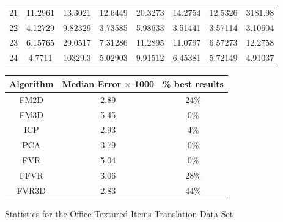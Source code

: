 \begin{figure}
\begin{tabular}{cccccccc}
21 & 11.2961 & 13.3021 & 12.6449 & 20.3273 & 14.2754 & 12.5326 & 3181.98\\
22 & 4.12729 & 9.82329 & 3.73585 & 5.98633 & 3.51441 & 3.57114 & 3.10604\\
23 & 6.15765 & 29.0517 & 7.31286 & 11.2895 & 11.0797 & 6.57273 & 12.2758\\
24 & 4.7711 & 10329.3 & 5.02903 & 9.91512 & 6.45381 & 5.72149 & 4.91037\\
\end{tabular}
\vspace{10mm}
\centering
\begin{tabular}{ccc}
\hline
\textbf{Algorithm} & \textbf{Median Error $\times$ 1000} & \textbf{\% best results}\\ \hline
FM2D	& 2.89 & 24\%\\
FM3D	& 5.45 & 0\%\\
ICP	& 2.93 & 4\%\\
PCA	& 3.79 & 0\%\\
FVR	& 5.04 & 0\%\\
FFVR	& 3.06 & 28\%\\
FVR3D	& 2.83 & 44\%\\
\end{tabular}
\caption{Statistics for the Office Textured Items Translation Data Set}
\label{tab:officetextureditemstranslation}
\end{figure} 




